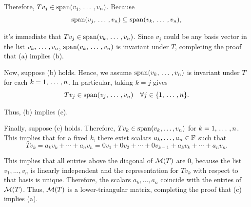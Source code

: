 \begin{xrcs}
\begin{xprf}
    Therefore, $T v_j \in \operatorname{span} (v_j, {\, \ldots \,\,}, v_n)$. Because
    \begin{equation}
      \operatorname{span} (v_j, {\, \ldots \,\,}, v_n) \subseteq \operatorname{span} (v_k, {\, \ldots \,\,}, v_n),
    \end{equation}

    it's immediate that $Tv_j \in \operatorname{span} (v_k, {\, \ldots \,\,}, v_n)$. Since $v_j$ could be any basis vector in the list $v_k, {\, \ldots \,\,}, v_n$, $\operatorname{span} (v_k, {\, \ldots \,\,}, v_n)$ is invariant under $T$, completing the proof that (a) implies (b).

    \StepTwo Now, suppose (b) holds. Hence, we assume $\operatorname{span} (v_k, {\, \ldots \,\,}, v_n)$ is invariant under $T$ for each $k = 1, {\, \ldots \,\,}, n$. In particular, taking $k = j$ gives
    \begin{equation}
      T v_j \in \operatorname{span} (v_j, {\, \ldots \,\,}, v_n) \quad \forall j \in \{1, {\, \ldots \,\,}, n\}.
    \end{equation}

    Thus, (b) implies (c).

    \StepThree Finally, suppose (c) holds. Therefore, $T v_k \in \operatorname{span} (v_k, \ldots, v_n)$ for $k = 1, {\, \ldots \,\,}, n$. This implies that for a fixed $k$, there exist scalars $a_k, \dots, a_n \in \mathbb{F}$ such that
    \begin{equation}
      \label{eq: lower triangular equation for T v_k}
      T v_k = a_k v_k + \cdots + a_n v_n = 0 v_1 + 0 v_2 + \cdots + 0 v_{k-1} + a_k v_k + \cdots + a_n v_n.
    \end{equation}

    This implies that all entries above the diagonal of $\mathcal{M} (T)$ are $0$, because the list $v_1, \ldots, v_n$ is linearly independent and the representation for $T v_k$ with respect to that basis is unique. Therefore, the scalars $a_k, \dots, a_n$ coincide with the entries of $\mathcal{M}(T)$. Thus, $\mathcal{M}(T)$ is a lower-triangular matrix, completing the proof that (c) implies (a).
  \end{xprf}
\end{xrcs}